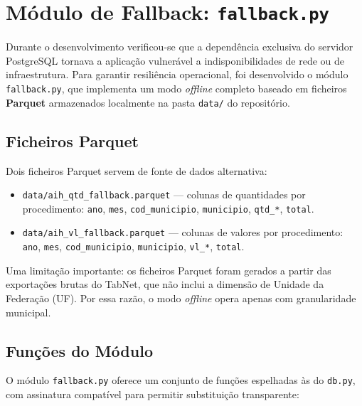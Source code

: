 \documentclass[12pt,a4paper]{report}
\begin{document}
\section{Módulo de Fallback: \texttt{fallback.py}}

Durante o desenvolvimento verificou-se que a dependência exclusiva do servidor
PostgreSQL tornava a aplicação vulnerável a indisponibilidades de rede ou de
infraestrutura. Para garantir resiliência operacional, foi desenvolvido o módulo
\texttt{fallback.py}, que implementa um modo \textit{offline} completo baseado em
ficheiros \textbf{Parquet} armazenados localmente na pasta \texttt{data/} do
repositório.

\subsection{Ficheiros Parquet}

Dois ficheiros Parquet servem de fonte de dados alternativa:

\begin{itemize}
    \item \texttt{data/aih\_qtd\_fallback.parquet} — colunas de quantidades por
    procedimento: \texttt{ano}, \texttt{mes}, \texttt{cod\_municipio},
    \texttt{municipio}, \texttt{qtd\_*}, \texttt{total}.
    \item \texttt{data/aih\_vl\_fallback.parquet} — colunas de valores por
    procedimento: \texttt{ano}, \texttt{mes}, \texttt{cod\_municipio},
    \texttt{municipio}, \texttt{vl\_*}, \texttt{total}.
\end{itemize}

Uma limitação importante: os ficheiros Parquet foram gerados a partir das exportações
brutas do TabNet, que não inclui a dimensão de Unidade da Federação (UF). Por essa
razão, o modo \textit{offline} opera apenas com granularidade municipal.

\subsection{Funções do Módulo}

O módulo \texttt{fallback.py} oferece um conjunto de funções espelhadas às do
\texttt{db.py}, com assinatura compatível para permitir substituição transparente:
\end{document}
